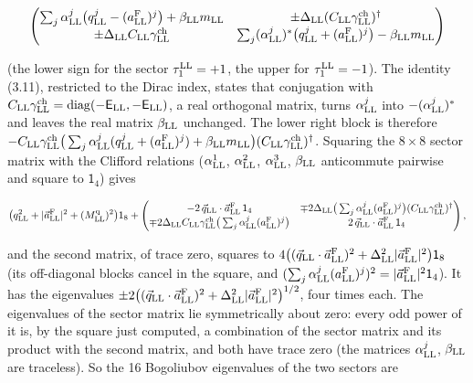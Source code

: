 \documentclass[
  10pt,
]{article}
\begin{document}
\[\begin{pmatrix}\sum_j\alpha^j_{\rm LL}\big(q^j_{\rm LL}-(a^{\rm F}_{\rm LL})^j\big)+\beta_{\rm LL}m_{\rm LL}&\pm\Delta_{\rm LL}(C_{\rm LL}\gamma^{\rm ch}_{\rm LL})^\dagger\\\pm\Delta_{\rm LL}C_{\rm LL}\gamma^{\rm ch}_{\rm LL}&\sum_j(\alpha^j_{\rm LL})^*\big(q^j_{\rm LL}+(a^{\rm F}_{\rm LL})^j\big)-\beta_{\rm LL}m_{\rm LL}\end{pmatrix}\]

(the lower sign for the sector \(\tau^{\rm LL}_1=+1\), the upper for
\(\tau^{\rm LL}_1=-1\)). The identity (3.11), restricted to the Dirac
index, states that conjugation with
\(C_{\rm LL}\gamma^{\rm ch}_{\rm LL}={\rm diag}(-\mathsf E_{\rm LL},-\mathsf E_{\rm LL})\),
a real orthogonal matrix, turns \(\alpha^j_{\rm LL}\) into
\(-(\alpha^j_{\rm LL})^*\) and leaves the real matrix \(\beta_{\rm LL}\)
unchanged. The lower right block is therefore
\(-C_{\rm LL}\gamma^{\rm ch}_{\rm LL}\big(\sum_j\alpha^j_{\rm LL}(q^j_{\rm LL}+(a^{\rm F}_{\rm LL})^j)+\beta_{\rm LL}m_{\rm LL}\big)(C_{\rm LL}\gamma^{\rm ch}_{\rm LL})^\dagger\).
Squaring the \(8\times8\) sector matrix with the Clifford relations
(\(\alpha^1_{\rm LL}\), \(\alpha^2_{\rm LL}\), \(\alpha^3_{\rm LL}\),
\(\beta_{\rm LL}\) anticommute pairwise and square to \(\mathsf 1_4\))
gives

\[\big(q_{\rm LL}^2+\lvert\vec a^{\rm F}_{\rm LL}\rvert^2+(M^{\rm q}_{\rm LL})^2\big)\mathsf 1_8+\begin{pmatrix}-2\,\vec q_{\rm LL}\cdot\vec a^{\rm F}_{\rm LL}\,\mathsf 1_4&\mp2\Delta_{\rm LL}\big(\sum_j\alpha^j_{\rm LL}(a^{\rm F}_{\rm LL})^j\big)(C_{\rm LL}\gamma^{\rm ch}_{\rm LL})^\dagger\\\mp2\Delta_{\rm LL}C_{\rm LL}\gamma^{\rm ch}_{\rm LL}\big(\sum_j\alpha^j_{\rm LL}(a^{\rm F}_{\rm LL})^j\big)&2\,\vec q_{\rm LL}\cdot\vec a^{\rm F}_{\rm LL}\,\mathsf 1_4\end{pmatrix},\]

and the second matrix, of trace zero, squares to
\(4\big((\vec q_{\rm LL}\cdot\vec a^{\rm F}_{\rm LL})^2+\Delta_{\rm LL}^2\lvert\vec a^{\rm F}_{\rm LL}\rvert^2\big)\mathsf 1_8\)
(its off-diagonal blocks cancel in the square, and
\((\sum_j\alpha^j_{\rm LL}(a^{\rm F}_{\rm LL})^j)^2=\lvert\vec a^{\rm F}_{\rm LL}\rvert^2\mathsf 1_4\)).
It has the eigenvalues
\(\pm2\big((\vec q_{\rm LL}\cdot\vec a^{\rm F}_{\rm LL})^2+\Delta_{\rm LL}^2\lvert\vec a^{\rm F}_{\rm LL}\rvert^2\big)^{1/2}\),
four times each. The eigenvalues of the sector matrix lie symmetrically
about zero: every odd power of it is, by the square just computed, a
combination of the sector matrix and its product with the second matrix,
and both have trace zero (the matrices \(\alpha^j_{\rm LL}\),
\(\beta_{\rm LL}\) are traceless). So the 16 Bogoliubov eigenvalues of
the two sectors are
\end{document}
